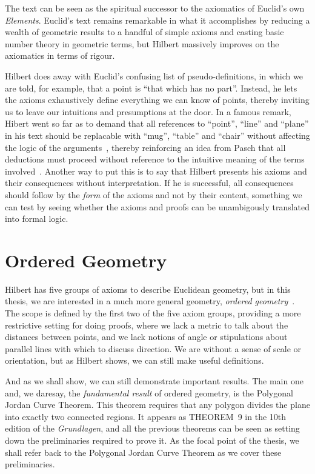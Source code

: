 The text can be seen as the spiritual successor to the axiomatics of Euclid's own \emph{Elements}. Euclid's text remains remarkable in what it accomplishes by reducing a wealth of geometric results to a handful of simple axioms and casting basic number theory in geometric terms, but Hilbert massively improves on the axiomatics in terms of rigour.

Hilbert does away with Euclid's confusing list of pseudo-definitions, in which we are told, for example, that a point is ``that which has no part''. Instead, he lets the axioms exhaustively define everything we can know of points, thereby inviting us to leave our intuitions and presumptions at the door. In a famous remark, Hibert went so far as to demand that all references to ``point'', ``line'' and ``plane'' in his text should be replacable with ``mug'', ``table'' and ``chair'' without affecting the logic of the arguments~\cite{TableChairMug}, thereby reinforcing an idea from Pasch that all deductions must proceed without reference to the intuitive meaning of the terms involved~\cite{PaschToPeano}. Another way to put this is to say that Hilbert presents his axioms and their consequences without interpretation. If he is successful, all consequences should follow by the \emph{form} of the axioms and not by their content, something we can test by seeing whether the axioms and proofs can be unambigously translated into formal logic.

\section{Ordered Geometry}
Hilbert has five groups of axioms to describe Euclidean geometry, but in this thesis, we are interested in a much more general geometry, \emph{ordered geometry}~\cite{AxiomaticsOrderedGeometry}. The scope is defined by the first two of the five axiom groups, providing a more restrictive setting for doing proofs, where we lack a metric to talk about the distances between points, and we lack notions of angle or stipulations about parallel lines with which to discuss direction. We are without a sense of scale or orientation, but as Hilbert shows, we can still make useful definitions.

And as we shall show, we can still demonstrate important results. The main one and, we daresay, the \emph{fundamental result} of ordered geometry, is the Polygonal Jordan Curve Theorem. This theorem requires that any polygon divides the plane into exactly two connected regions. It appears as THEOREM~9 in the 10th edition of the \emph{Grundlagen}, and all the previous theorems can be seen as setting down the preliminaries required to prove it. As the focal point of the thesis, we shall refer back to the Polygonal Jordan Curve Theorem as we cover these preliminaries.

